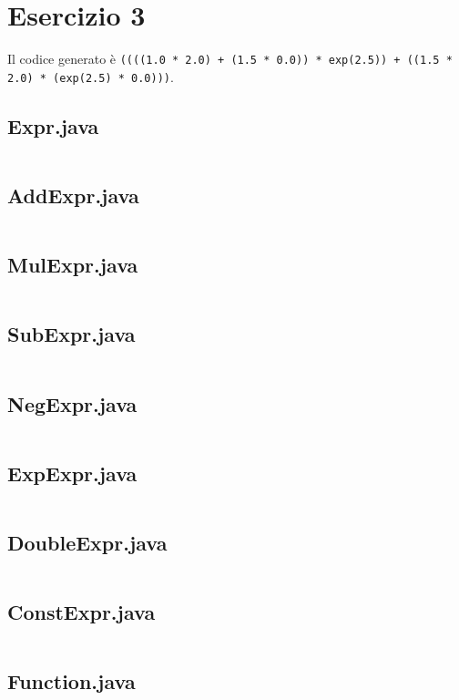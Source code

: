 \section*{Esercizio 3}

Il codice generato è \texttt{((((1.0 * 2.0) + (1.5 * 0.0)) * exp(2.5)) + ((1.5 * 2.0) * (exp(2.5) * 0.0)))}.

\subsection*{Expr.java}
\inputminted{java}{tex/src/3/Expr.java}

\subsection*{AddExpr.java}
\inputminted{java}{tex/src/3/AddExpr.java}

\subsection*{MulExpr.java}
\inputminted{java}{tex/src/3/MulExpr.java}

\subsection*{SubExpr.java}
\inputminted{java}{tex/src/3/SubExpr.java}

\subsection*{NegExpr.java}
\inputminted{java}{tex/src/3/NegExpr.java}

\subsection*{ExpExpr.java}
\inputminted{java}{tex/src/3/ExpExpr.java}

\subsection*{DoubleExpr.java}
\inputminted{java}{tex/src/3/DoubleExpr.java}

\subsection*{ConstExpr.java}
\inputminted{java}{tex/src/3/ConstExpr.java}

\subsection*{Function.java}
\inputminted{java}{tex/src/3/Function.java}

